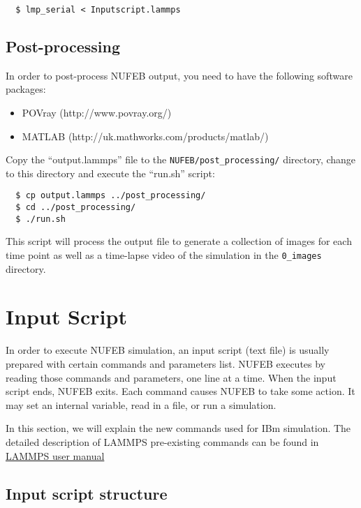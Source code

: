 \documentclass[11pt,a4paper,openright]{article}
\begin{document}
\begin{verbatim}
  $ lmp_serial < Inputscript.lammps
\end{verbatim}

\subsection{Post-processing}

In order to post-process NUFEB output, you need to have the following software packages:

\begin{itemize}
\item POVray (http://www.povray.org/)
\item MATLAB (http://uk.mathworks.com/products/matlab/)
\end{itemize}

\noindent
Copy the ``output.lammps'' file to the {\tt NUFEB/post\_processing/} directory, change to this directory and execute the ``run.sh'' script:

\begin{verbatim}
  $ cp output.lammps ../post_processing/
  $ cd ../post_processing/ 
  $ ./run.sh
\end{verbatim}

\noindent
This script will process the output file to generate a collection of images for each time point as well as a time-lapse video of the simulation in the {\tt 0\_images} directory.

\section{Input Script}

In order to execute NUFEB simulation, an input script (text file) is usually prepared with certain commands and parameters list. NUFEB executes by reading those commands and parameters, one line at a time. When the input script ends, NUFEB exits. Each command causes NUFEB to take some action. It may set an internal variable, read in a file, or run a simulation.

In this section, we will explain the new commands used for IBm simulation. The detailed description of LAMMPS pre-existing commands can be found in 
\href{http://lammps.sandia.gov/doc/Manual.pdf}{LAMMPS user manual}

\subsection{Input script structure}
\end{document}
